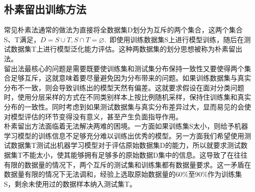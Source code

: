  \subsection{朴素留出训练方法}
 \indent 常见朴素法通常的做法为直接将全数据集D划分为互斥的两个集合，这两个集合S、T满足，$D=S \cup T, S \cap T=\varnothing$.~即使用训练数据集S上进行模型训练，随后在测试数据集T上进行模型泛化能力评估。这种两数据集的划分思想被称为朴素留出法。\\
 \indent 留出法最核心的问题是需要既要使训练集和测试集分布保持一致性又要使得两个集合足够互斥，这就意味着要尽量避免因为分布带来的问题。如果训练数据集与真实分布不一致，则会导致训练出的模型天然有偏差。这就要求假设在面对分类问题时，使用分层采样的方式在不同类别样本上按比例随机采样，保持住训练集和真实分布的一致性。同时考虑到如果测试数据集与真实分布差异过大，显而易见的会使对模型评估的环节变得没有意义，甚至产生负面指导作用。\\
 \indent 朴素留出方法面临着无法解决两难的困境。一方面如果训练集S太小，则给予机器学习模型的训练信息不足够充分难以训练出优秀的模型。另一方面我们希望使用测试数据集T测试出机器学习模型对于评估原始数据集D的能力，所以就要求测试数据集T不能太小，使其能够拥有足够多的原始数据D集中的信息。这导致了在往往有限的数据量的情况下，两个互斥的测试集和训练集都有数据量要求。这一矛盾在数据量有限的情况下无法调和，经验上选取原始数据量的60\%至90\%作为训练集S，剩余未使用过的数据样本纳入测试集T。\\
